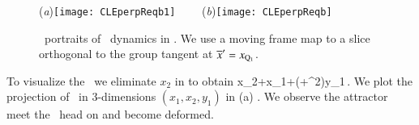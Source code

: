 %
\begin{figure}[ht]
\begin{center}
  (\textit{a})\texttt{[image: CLEperpReqb1]}
~~~~(\textit{b})\texttt{[image: CLEperpReqb]}
\end{center}
\caption{
\Statesp\ portraits of \cLe\ dynamics in \reducedsp. We use a
moving frame map to a slice orthogonal to the group tangent
at  ${\overline{x}'}  = x_{\mathrm{Q}_{1}}$.
    }
\label{fig:CLEmfReqb1}
\end{figure}
%

To visualize the \sset\ we eliminate $x_2$ in  to obtain
\beq
	x_2+x_1+\left(+^2\right)y_1\,.
We plot the projection of \sset\ in $3$-dimensions $(x_1,x_2,y_1)$ in (a)
.
We observe the attractor meet the \sset\ head on and become deformed. 

